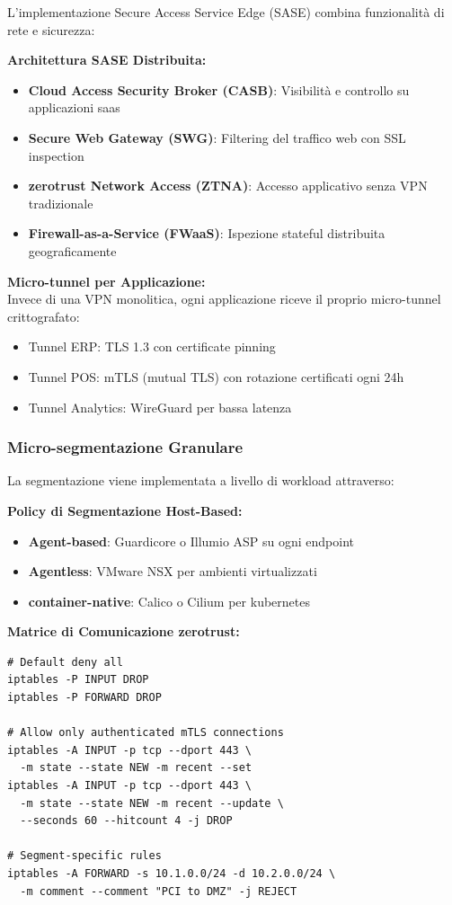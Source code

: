 L'implementazione Secure Access Service Edge (SASE) combina funzionalità di rete e sicurezza:

\textbf{Architettura SASE Distribuita:}
\begin{itemize}
    \item \textbf{Cloud Access Security Broker (CASB)}: Visibilità e controllo su applicazioni \gls{saas}
    \item \textbf{Secure Web Gateway (SWG)}: Filtering del traffico web con SSL inspection
    \item \textbf{\gls{zerotrust} Network Access (ZTNA)}: Accesso applicativo senza VPN tradizionale
    \item \textbf{Firewall-as-a-Service (FWaaS)}: Ispezione stateful distribuita geograficamente
\end{itemize}

\textbf{Micro-tunnel per Applicazione:}\\
Invece di una VPN monolitica, ogni applicazione riceve il proprio micro-tunnel crittografato:
\begin{itemize}
    \item Tunnel ERP: TLS 1.3 con certificate pinning
    \item Tunnel POS: mTLS (mutual TLS) con rotazione certificati ogni 24h
    \item Tunnel Analytics: WireGuard per bassa latenza
\end{itemize}

\subsubsection{\texorpdfstring{Micro-segmentazione Granulare}{3.5.1.3 - Micro-segmentazione Granulare}}

La segmentazione viene implementata a livello di workload attraverso:

\textbf{Policy di Segmentazione Host-Based:}
\begin{itemize}
    \item \textbf{Agent-based}: Guardicore o Illumio ASP su ogni endpoint
    \item \textbf{Agentless}: VMware NSX per ambienti virtualizzati
    \item \textbf{\gls{container}-native}: Calico o Cilium per \gls{kubernetes}
\end{itemize}

\textbf{Matrice di Comunicazione \gls{zerotrust}:}
\begin{lstlisting}[caption={Regole iptables per micro-segmentazione},label={lst:iptables}]
# Default deny all
iptables -P INPUT DROP
iptables -P FORWARD DROP

# Allow only authenticated mTLS connections
iptables -A INPUT -p tcp --dport 443 \
  -m state --state NEW -m recent --set
iptables -A INPUT -p tcp --dport 443 \
  -m state --state NEW -m recent --update \
  --seconds 60 --hitcount 4 -j DROP

# Segment-specific rules
iptables -A FORWARD -s 10.1.0.0/24 -d 10.2.0.0/24 \
  -m comment --comment "PCI to DMZ" -j REJECT
\end{lstlisting}

